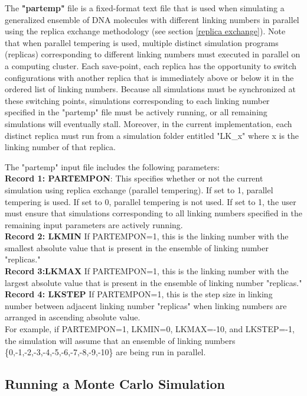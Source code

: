 \documentclass[english]{article}
\begin{document}
The \textbf{"partemp"} file is a fixed-format text file that is used when simulating a generalized ensemble of DNA molecules with different linking numbers in parallel using the replica exchange methodology (see section \ref{replica exchange}). Note that when parallel tempering is used, multiple distinct simulation programs (replicas) corresponding to different linking numbers must executed in parallel on a computing cluster. Each save-point, each replica has the opportunity to switch configurations with another replica that is immediately above or below it in the ordered list of linking numbers. Because all simulations must be synchronized at these switching points, simulations corresponding to each linking number specified in the "partemp" file must be actively running, or all remaining simulations will eventually stall. Moreover, in the current implementation, each distinct replica must run from a simulation folder entitled "LK_x" where x is the linking number of that replica.


The "partemp" input file includes the following parameters:\\

\textbf{Record 1: PARTEMPON}: This specifies whether or not the current simulation using replica exchange (parallel tempering). If set to 1, parallel tempering is used. If set to 0, parallel tempering is not used. If set to 1, the user must ensure that simulations corresponding to all linking numbers specified in the remaining input parameters are actively running.\\
\textbf{Record 2: LKMIN} If PARTEMPON=1, this is the linking number with the smallest absolute value that is present in the ensemble of linking number "replicas."\\
\textbf{Record 3:LKMAX} If PARTEMPON=1, this is the linking number with the largest absolute value that is present in the ensemble of linking number "replicas."\\
\textbf{Record 4: LKSTEP} If PARTEMPON=1, this is the step size in linking number between adjacent linking number "replicas" when linking numbers are arranged in ascending absolute value.\\

For example, if PARTEMPON=1, LKMIN=0, LKMAX=-10, and LKSTEP=-1, the simulation will assume that an ensemble of linking numbers \{0,-1,-2,-3,-4,-5,-6,-7,-8,-9,-10\} are being run in parallel.

\subsection{Running a Monte Carlo Simulation}
\end{document}
